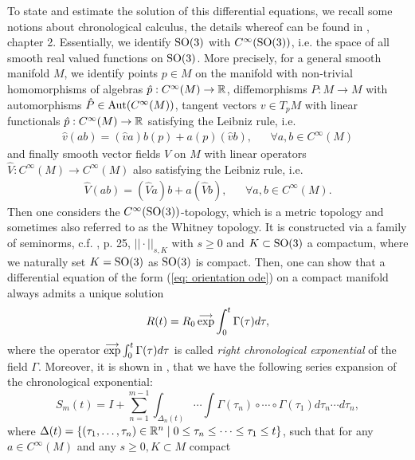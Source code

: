 To state and estimate the solution of this differential equations, we recall some notions about chronological calculus, the details whereof  can be found in \cite{Agrachev2004}, chapter 2. Essentially, we identify $\operatorname{SO}(3)$ with $C^\infty(\operatorname{SO}(3))$, i.e. the space of all smooth real valued functions on $\operatorname{SO}(3)$. More precisely, for a general smooth manifold $M$, we identify points $p \in M$ on the manifold with non-trivial homomorphisms of algebras $\hat{p}: C^{\infty}(M) \to \mathbb{R}$, diffemorphisms $P : M \to M$ with automorphisms $\hat{P} \in \operatorname{Aut}(C^{\infty}(M))$, tangent vectors $v \in T_p M$ with linear functionals $\hat{p}: C^{\infty}(M) \to \mathbb{R}$ satisfying the Leibniz rule, i.e.
\begin{align}
	\hat{v}(ab) = (\hat{v} a) b(p) + a(p) (\hat{v} b), & & \forall a, b \in C^{\infty}(M)
\end{align}
and finally smooth vector fields $V$ on $M$ with linear operators $\hat{V}: C^{\infty}(M) \to C^{\infty}(M)$ also satisfying the Leibniz rule, i.e.
\begin{align}
	\hat{V}(ab) = (\hat{V} a) b + a (\hat{V} b), & &  \forall a,b \in C^{\infty}(M).
\end{align}
 Then one considers the $C^{\infty}(\operatorname{SO}(3))$-topology, which is a metric topology and sometimes also referred to as the Whitney topology. It is constructed via a family of seminorms, c.f. \cite{Agrachev2004}, p. 25, $||\cdot||_{s, K}$ with $s \geq 0$ and $K \subset \operatorname{SO}(3)$ a compactum, where we naturally set $K = \operatorname{SO}(3)$ as $\operatorname{SO}(3)$ is compact. Then, one can show that a differential equation of the form (\ref{eq: orientation ode}) on a compact manifold always admits a unique solution
\begin{align}
 R(t) = R_0 \, \overset{\longrightarrow}{\exp} \int_{0}^{t} \Gamma(\tau) d \tau,
\end{align}
where the operator $\overset{\longrightarrow}{\exp} \int_{0}^{t} \Gamma(\tau) d\tau$ is called \emph{right chronological exponential} of the field $\Gamma$. Moreover, it is shown in \cite{Agrachev2004}, that we have the following series expansion of the chronological exponential:
\begin{equation}
\label{eq: partial sum of chronological exp}
	S_m(t) = I + \sum_{n = 1}^{m - 1} \int_{\Delta_n(t)} \dotsm \int \Gamma(\tau_n) \circ \dotsm \circ \Gamma(\tau_1) d \tau_n \dotsm d \tau_n,
\end{equation}
where $\Delta(t) = \{(\tau_1, \dotsc, \tau_n) \in \mathbb{R}^n \mid 0 \leq \tau_n \leq \dotsm \leq \tau_1 \leq t\}$, such that for any $a \in C^{\infty}(M)$ and any $s \geq 0, K \subset M$ compact
